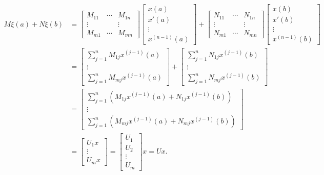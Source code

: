 \documentclass[11pt, oneside, a4paper]{article}
\begin{document}
\begin{align*}
    M\xi(a) + N\xi(b) &= \begin{bmatrix}
        M_{11} & \cdots & M_{1n}\\
        \vdots &  & \vdots\\
        M_{m1} & \cdots & M_{mn}
    \end{bmatrix}\begin{bmatrix}x(a)\\ x'(a)\\ \vdots \\ x^{(n-1)}(a)
        \end{bmatrix} + \begin{bmatrix}
            N_{11} & \cdots & N_{1n}\\
            \vdots &  & \vdots\\
            N_{m1} & \cdots & N_{mn}
        \end{bmatrix}\begin{bmatrix}x(b)\\ x'(b)\\ \vdots \\ x^{(n-1)}(b)
        \end{bmatrix}\\
        &= \begin{bmatrix}
            \sum_{j=1}^n M_{1j}x^{(j-1)}(a)\\
            \vdots\\
            \sum_{j=1}^n M_{mj}x^{(j-1)}(a)
        \end{bmatrix} + \begin{bmatrix}
            \sum_{j=1}^n N_{1j}x^{(j-1)}(b)\\
            \vdots\\
            \sum_{j=1}^n N_{mj}x^{(j-1)}(b)
        \end{bmatrix}\\
        &= \begin{bmatrix}
            \sum_{j=1}^n (M_{1j}x^{(j-1)}(a) + N_{1j}x^{(j-1)}(b))\\
            \vdots\\
            \sum_{j=1}^n (M_{mj}x^{(j-1)}(a) + N_{mj}x^{(j-1)}(b))
        \end{bmatrix}\\
        &= \begin{bmatrix}
            U_1 x\\
            \vdots\\
            U_m x
        \end{bmatrix} = \begin{bmatrix}U_1\\ U_2\\ \vdots \\ U_m
        \end{bmatrix}x = Ux.
\end{align*}
\end{document}
